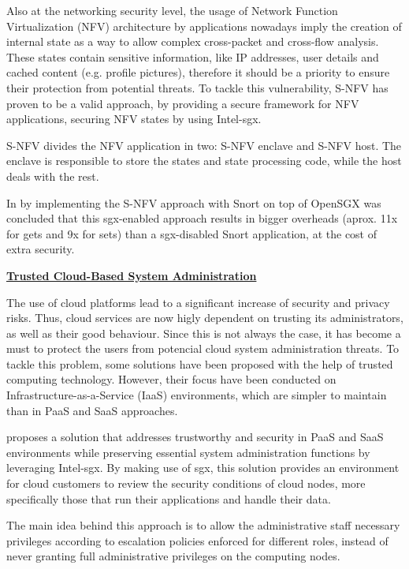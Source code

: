 Also at the networking security level, the usage of Network Function Virtualization (NFV) architecture by applications nowadays imply the creation of internal state as a way to allow complex cross-packet and cross-flow analysis. 
These states contain sensitive information, like IP addresses, user details and cached content (e.g. profile pictures), therefore it should be a priority to ensure their protection from potential threats.
To tackle this vulnerability, S-NFV \cite{sNFVPaper} has proven to be a valid approach, by providing a secure framework for NFV applications, securing NFV states by using Intel-\gls{sgx}.

S-NFV divides the NFV application in two: S-NFV enclave and S-NFV host. The enclave is responsible to store the states and state processing code, while the host deals with the rest.

In \cite{sNFVPaper} by implementing the S-NFV approach with Snort \cite{snortPaper} on top of OpenSGX was
concluded that this \gls{sgx}-enabled approach results in bigger overheads (aprox. 11x for
gets and 9x for sets) than a \gls{sgx}-disabled Snort application, at the cost of extra security.\newline


\underline{\textbf{Trusted Cloud-Based System Administration}}

The use of cloud platforms lead to a significant increase of security and privacy risks. Thus, cloud services are now higly dependent on trusting its administrators, as well as their good behaviour. Since this is not always the case, it has become a must to protect the users from potencial cloud system administration threats. 
To tackle this problem, some solutions have been proposed with the help of trusted computing technology. However, their focus have been conducted on Infrastructure-as-a-Service (IaaS) environments, which are simpler to maintain than in PaaS and SaaS approaches.

\cite{sgxCloudThesis} proposes a solution that addresses trustworthy and security in PaaS and SaaS environments while preserving essential system administration functions by leveraging Intel-\gls{sgx}. By making use of \gls{sgx}, this solution provides an environment for cloud customers to review the security conditions of cloud nodes, more specifically those that run their applications and handle their data.

The main idea behind this approach is to allow the administrative staff necessary privileges according to escalation policies enforced for different roles, instead of never granting full administrative privileges on the computing nodes.

